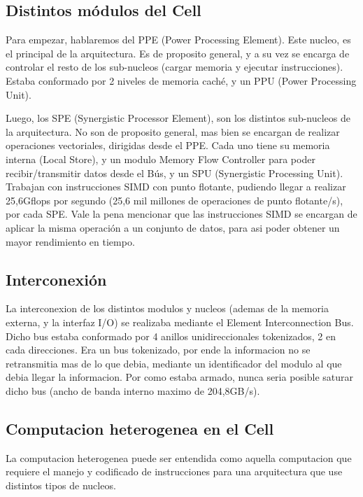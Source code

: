 \documentclass[10pt,compsoc]{IEEEtran}
\begin{document}
	
	\subsection{Distintos módulos del Cell} 
	\noindent Para empezar, hablaremos del PPE (Power Processing Element). Este nucleo, es el principal de la arquitectura. Es de proposito general, y a su vez se encarga de controlar el resto de los sub-nucleos (cargar memoria y ejecutar instrucciones). Estaba conformado por 2 niveles de memoria caché, y un PPU (Power Processing Unit).\newline
	
	Luego, los SPE (Synergistic Processor Element), son los distintos sub-nucleos de la arquitectura. No son de proposito general, mas bien se encargan de realizar operaciones vectoriales, dirigidas desde el PPE. Cada uno tiene su memoria interna (Local Store), y un modulo Memory Flow Controller para poder recibir/transmitir datos desde el Bús, y un SPU (Synergistic Processing Unit).
	Trabajan con instrucciones SIMD con punto flotante, pudiendo llegar a realizar 25,6Gflops por segundo (25,6 mil millones de operaciones de punto flotante/s), por cada SPE. Vale la pena mencionar que las instrucciones SIMD se encargan de aplicar la misma operación a un conjunto de datos, para asi poder obtener un mayor rendimiento en tiempo.\newline
	
	\subsection{Interconexión} 
	\noindent La interconexion de los distintos modulos y nucleos (ademas de la memoria externa, y la interfaz I/O) se realizaba mediante el Element Interconnection Bus. Dicho bus estaba conformado por 4 anillos unidireccionales tokenizados, 2 en cada direcciones. Era un bus tokenizado, por ende la informacion no se retransmitia mas de lo que debia, mediante un identificador del modulo al que debia llegar la informacion. 
	Por como estaba armado, nunca seria posible saturar dicho bus (ancho de banda interno maximo de 204,8GB/s).
	

	
	\subsection{Computacion heterogenea en el Cell }%
	\noindent La computacion heterogenea puede ser entendida como aquella computacion que requiere el manejo y codificado de instrucciones para una arquitectura que use distintos tipos de nucleos.\newline
	
\end{document}
